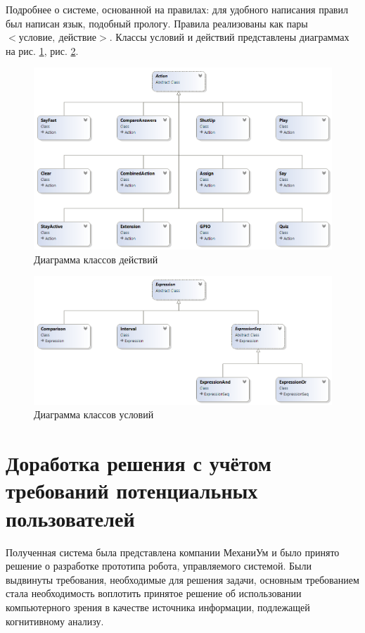 Подробнее о системе, основанной на правилах: для удобного написания правил был написан язык, подобный прологу. Правила реализованы как пары $<\texttt{условие},\  \texttt{действие}>$. Классы условий и действий представлены диаграммах на рис. \ref{action_diag_ing},  рис. \ref{expression_diag_ing}.

\begin{figure}[H]
    \centering
    \includegraphics[scale=0.75]{images/action.png}
    \caption{Диаграмма классов действий}
    \label{action_diag_ing}
\end{figure}

\begin{figure}[H]
    \centering
    \includegraphics[scale=0.75]{images/expression.png}
    \caption{Диаграмма классов условий}
    \label{expression_diag_ing}
\end{figure}

\section{Доработка решения с учётом требований потенциальных пользователей}
Полученная система была представлена компании МеханиУм и было принято решение о разработке прототипа робота, управляемого системой. Были выдвинуты требования, необходимые для решения задачи, основным требованием стала необходимость воплотить принятое решение об использовании компьютерного зрения в качестве источника информации, подлежащей когнитивному анализу.

